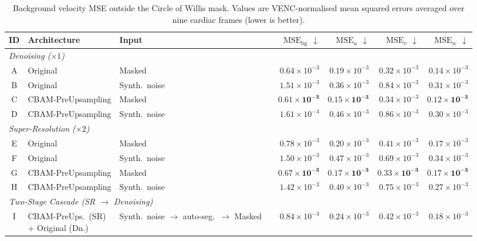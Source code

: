 \documentclass[11pt]{article}
\begin{document}
\begin{table}[!htbp]
  \centering
  \caption{Background velocity MSE outside the Circle of Willis mask.  Values are VENC-normalised
  mean squared errors averaged over nine cardiac frames (lower is better).}
  \label{tab:background}
  \setlength{\tabcolsep}{4.5pt}
  \small
  \begin{tabular}{cll l rrrr}
    \toprule
    ID & Architecture & Input & &
      $\text{MSE}_{\text{bg}}$ $\downarrow$ &
      $\text{MSE}_{u}$ $\downarrow$ &
      $\text{MSE}_{v}$ $\downarrow$ &
      $\text{MSE}_{w}$ $\downarrow$ \\
    \midrule
    \multicolumn{8}{l}{\textit{Denoising ($\times 1$)}} \\
    \midrule
    A & Original           & Masked       & & $0.64{\times}10^{-3}$ & $0.19{\times}10^{-3}$ & $0.32{\times}10^{-3}$ & $0.14{\times}10^{-3}$ \\
    B & Original           & Synth.\ noise & & $1.51{\times}10^{-3}$ & $0.36{\times}10^{-3}$ & $0.84{\times}10^{-3}$ & $0.31{\times}10^{-3}$ \\
    C & CBAM-PreUpsampling & Masked       & & $\mathbf{0.61{\times}10^{-3}}$ & $\mathbf{0.15{\times}10^{-3}}$ & $0.34{\times}10^{-3}$ & $\mathbf{0.12{\times}10^{-3}}$ \\
    D & CBAM-PreUpsampling & Synth.\ noise & & $1.61{\times}10^{-3}$ & $0.46{\times}10^{-3}$ & $0.86{\times}10^{-3}$ & $0.30{\times}10^{-3}$ \\
    \midrule
    \multicolumn{8}{l}{\textit{Super-Resolution ($\times 2$)}} \\
    \midrule
    E & Original           & Masked        & & $0.78{\times}10^{-3}$ & $0.20{\times}10^{-3}$ & $0.41{\times}10^{-3}$ & $0.17{\times}10^{-3}$ \\
    F & Original           & Synth.\ noise & & $1.50{\times}10^{-3}$ & $0.47{\times}10^{-3}$ & $0.69{\times}10^{-3}$ & $0.34{\times}10^{-3}$ \\
    G & CBAM-PreUpsampling & Masked        & & $\mathbf{0.67{\times}10^{-3}}$ & $\mathbf{0.17{\times}10^{-3}}$ & $\mathbf{0.33{\times}10^{-3}}$ & $\mathbf{0.17{\times}10^{-3}}$ \\
    H & CBAM-PreUpsampling & Synth.\ noise & & $1.42{\times}10^{-3}$ & $0.40{\times}10^{-3}$ & $0.75{\times}10^{-3}$ & $0.27{\times}10^{-3}$ \\
    \midrule
    \multicolumn{8}{l}{\textit{Two-Stage Cascade (SR $\to$ Denoising)}} \\
    \midrule
    I & \makecell[l]{CBAM-PreUps.\ (SR)\\+ Original (Dn.)} & \makecell[l]{Synth.\ noise $\to$\\auto-seg.\ $\to$ Masked} & & $0.84{\times}10^{-3}$ & $0.24{\times}10^{-3}$ & $0.42{\times}10^{-3}$ & $0.18{\times}10^{-3}$ \\

\end{tabular}
\end{table}
\end{document}
